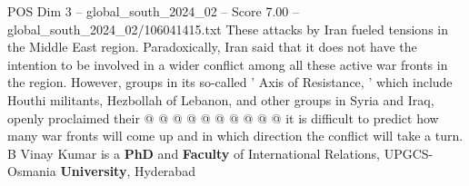 \begin{textsample}{POS Dim 3 – global\_south\_2024\_02 – Score 7.00 – global\_south\_2024\_02/106041415.txt}
These attacks by Iran fueled tensions in the Middle East region.
Paradoxically, Iran said that it does not have the intention to be involved in a wider conflict among all these active war fronts in the region.
However, groups in its so-called ' Axis of Resistance, ' which include Houthi militants, Hezbollah of Lebanon, and other groups in Syria and Iraq, openly proclaimed their @ @ @ @ @ @ @ @ @ @ it is difficult to predict how many war fronts will come up and in which direction the conflict will take a turn.
B Vinay Kumar is a \textbf{PhD} and \textbf{Faculty} of International Relations, UPGCS-Osmania \textbf{University}, Hyderabad

\end{textsample}
